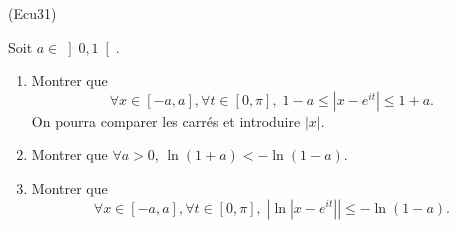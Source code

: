 \begin{tiny}(Ecu31)\end{tiny} Soit $a\in \left] 0,1 \right[$.
\begin{enumerate}
 \item Montrer que
 \[
  \forall x\in \left[ -a,a \right], \forall t\in \left[ 0, \pi \right] ,\;
  1-a \leq \left| x - e^{it} \right| \leq 1+a.
 \]
On pourra comparer les carrés et introduire $|x|$.
 \item Montrer que $\forall a>0$, $\ln(1+a)< -\ln(1-a)$.
 \item Montrer que
 \[
  \forall x\in \left[ -a,a \right], \forall t\in \left[ 0, \pi \right] ,\;
  \left|\ln\left| x - e^{it} \right|\right| \leq -\ln(1-a).
 \]

\end{enumerate}

